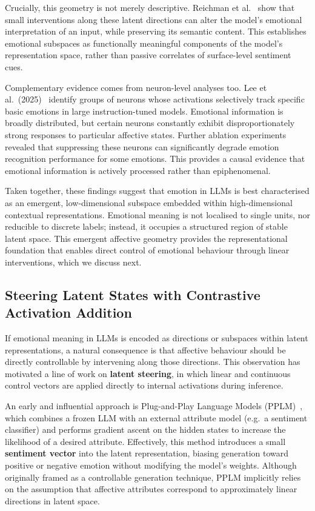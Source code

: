 Crucially, this geometry is not merely descriptive. Reichman et al.~\cite{reichman2025emotionsartthouunderstanding} show that small interventions along these latent directions can alter the model's emotional interpretation of an input, while preserving its semantic content. This establishes emotional subspaces as functionally meaningful components of the model's representation space, rather than passive correlates of surface-level sentiment cues.

Complementary evidence comes from neuron-level analyses too. Lee et al.\ (2025)~\cite{lee-etal-2025-large} identify groups of neurons whose activations selectively track specific basic emotions in large instruction-tuned models. Emotional information is broadly distributed, but certain neurons constantly exhibit disproportionately strong responses to particular affective states. Further ablation experiments revealed that suppressing these neurons can significantly degrade emotion recognition performance for some emotions. This provides a causal evidence that emotional information is actively processed rather than epiphenomenal.

Taken together, these findings suggest that emotion in LLMs is best characterised as an emergent, low-dimensional subspace embedded within high-dimensional contextual representations. Emotional meaning is not localised to single units, nor reducible to discrete labels; instead, it occupies a structured region of stable latent space. This emergent affective geometry provides the representational foundation that enables direct control of emotional behaviour through linear interventions, which we discuss next.

\subsection{Steering Latent States with Contrastive Activation Addition}

If emotional meaning in LLMs is encoded as directions or subspaces within latent representations, a natural consequence is that affective behaviour should be directly controllable by intervening along those directions. This observation has motivated a line of work on \textbf{latent steering}, in which linear and continuous control vectors are applied directly to internal activations during inference.

An early and influential approach is Plug-and-Play Language Models (PPLM)~\cite{dathathri2020plugplaylanguagemodels}, which combines a frozen LLM with an external attribute model (e.g.\ a sentiment classifier) and performs gradient ascent on the hidden states to increase the likelihood of a desired attribute. Effectively, this method introduces a small \textbf{sentiment vector} into the latent representation, biasing generation toward positive or negative emotion without modifying the model's weights. Although originally framed as a controllable generation technique, PPLM implicitly relies on the assumption that affective attributes correspond to approximately linear directions in latent space.

